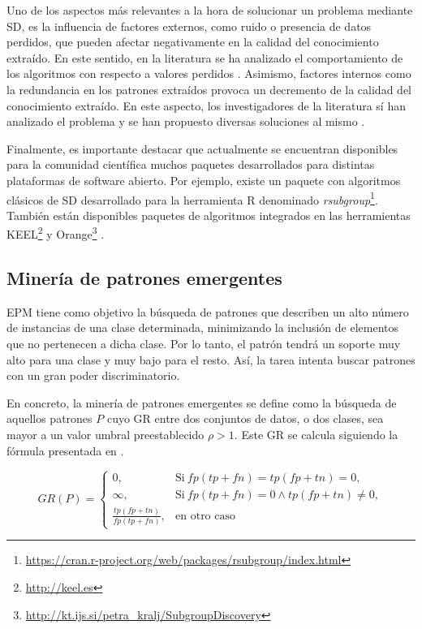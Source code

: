 \documentclass[c5paper,10pt,twoside]{book}	   	%
\begin{document}
Uno de los aspectos más relevantes a la hora de solucionar un problema mediante \ac{SD}, es la influencia de factores externos, como ruido o presencia de datos perdidos, que pueden afectar negativamente en la calidad del conocimiento extraído. En este sentido, en la literatura se ha analizado el comportamiento de los algoritmos con respecto a valores perdidos \cite{Clgd12}. Asimismo, factores internos como la redundancia en los patrones extraídos provoca un decremento de la calidad del conocimiento extraído. En este aspecto, los investigadores de la literatura sí han analizado el problema y se han propuesto diversas soluciones al mismo \cite{Lltsss14,Lpdk15}.

Finalmente, es importante destacar que actualmente se encuentran disponibles para la comunidad científica muchos paquetes desarrollados para distintas plataformas de software abierto. Por ejemplo, existe un paquete con algoritmos clásicos de \ac{SD} desarrollado para la herramienta R denominado \textit{rsubgroup}\footnote{\url{https://cran.r-project.org/web/packages/rsubgroup/index.html}}. También están disponibles paquetes de algoritmos integrados en las herramientas KEEL\footnote{\url{http://keel.es}} \cite{KEEL3} y Orange\footnote{\url{http://kt.ijs.si/petra\_kralj/SubgroupDiscovery}} \cite{Orange}.

\subsection{Minería de patrones emergentes}

\ac{EPM} \cite{Dl99,Gcmgj18} tiene como objetivo la búsqueda de patrones que describen un alto número de instancias de una clase determinada, minimizando la inclusión de elementos que no pertenecen a dicha clase. Por lo tanto, el patrón tendrá un soporte muy alto para una clase y muy bajo para el resto. Así, la tarea intenta buscar patrones con un gran poder discriminatorio.

En concreto, la minería de patrones emergentes se define como la búsqueda de aquellos patrones $P$ cuyo \ac{GR} entre dos conjuntos de datos, o dos clases, sea mayor a un valor umbral preestablecido $\rho > 1$. Este \ac{GR} se calcula siguiendo la fórmula presentada en  \cite{Dl99}.

	\begin{equation}
GR(P) = 
\begin{cases}
0, & \text{Si}\ fp\left(tp+fn\right) = tp\left(fp+tn\right) = 0, \\
\infty, & \text{Si}\ fp\left(tp+fn\right) = 0 \wedge tp\left(fp+tn\right) \neq 0, \\
\frac{tp\left(fp+tn\right)}{fp\left(tp+fn\right)}, & \text{en otro caso}
\end{cases}
\label{eq:gr}
\end{equation}
\end{document}
